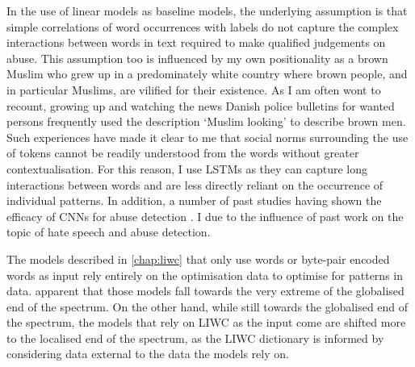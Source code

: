 In the use of linear models as baseline models, the underlying assumption  is that simple correlations of word occurrences with labels do not capture the complex interactions between words in text required to make qualified judgements on abuse.
This assumption too is influenced by my own positionality as a brown Muslim who grew up in a predominately white country where brown people, and in particular Muslims, are vilified for their existence.
As I am often wont to recount, growing up and watching the news Danish police bulletins for wanted persons frequently used the description `Muslim looking' to describe brown men.
Such experiences have made it clear to me that social norms surrounding the use of tokens cannot be readily understood from the words  without greater contextualisation.
For this reason, I use LSTMs as they can capture long interactions between words and are less directly reliant on the occurrence of individual patterns.
In addition, a number of past studies having shown the efficacy of CNNs for abuse detection \citep{Park:2017, Mitchell:2019,Kolhatkar:2020,Rizwan:2020,Safaya:2020,Gamback:2017}.
I   due to the influence of past work on the topic of hate speech and abuse detection.

The models described in \autoref{chap:liwc} that only use words or byte-pair encoded words as input rely entirely on the optimisation data to optimise for patterns in data.
 apparent that those models fall towards the very extreme of the globalised end of the  spectrum.
On the other hand, while still towards the globalised end of the spectrum, the models that rely on LIWC as the input come are shifted more to the localised end of the spectrum, as the LIWC dictionary  is informed by considering data external to the data the models rely on.


